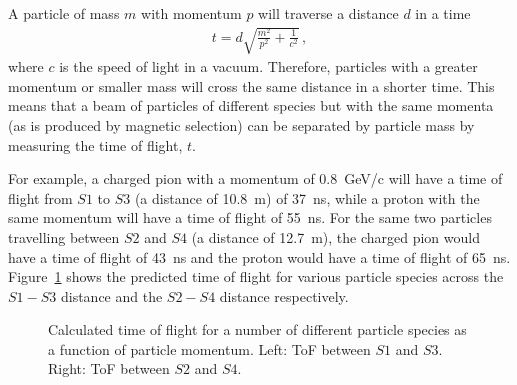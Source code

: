 A particle of mass $m$ with momentum $p$ will traverse a distance $d$ in a time
\begin{align}
  t = d \sqrt{\frac{m^2}{p^2} + \frac{1}{c^2}} \,, 
\end{align}
where $c$ is the speed of light in a vacuum.
Therefore, particles with a greater momentum or smaller mass will cross the same distance in a shorter time.
This means that a beam of particles of different species but with the same momenta (as is produced by magnetic selection) can be separated by particle mass by measuring the time of flight, $t$.

For example, a charged pion with a momentum of 0.8~GeV/c will have a time of flight from $\mathit{S1}$ to $\mathit{S3}$ (a distance of 10.8~m) of 37~ns, while a proton with the same momentum will have a time of flight of 55~ns.
For the same two particles travelling between $\mathit{S2}$ and $\mathit{S4}$ (a distance of 12.7~m), the charged pion would have a time of flight of 43~ns and the proton would have a time of flight of 65~ns.
Figure~\ref{fig:s1s3PredTimes} shows the predicted time of flight for various particle species across the $\mathit{S1}-\mathit{S3}$ distance and the $\mathit{S2}-\mathit{S4}$ distance respectively.

\begin{figure}[ht]
  
  \begin{minipage}[t]{0.49\textwidth}
    \begin{adjustbox}{max totalsize={\textwidth}{.5\textheight},center}
      
    \end{adjustbox}
  \end{minipage}
  \hfill
  \begin{minipage}[t]{0.49\textwidth}
    \begin{adjustbox}{max totalsize={\textwidth}{.5\textheight},center}
      
    \end{adjustbox}
  \end{minipage}
   \caption{\label{fig:s1s3PredTimes}Calculated time of flight for a number of different particle species as a function of particle momentum. Left: ToF between $\mathit{S1}$ and $\mathit{S3}$. Right: ToF between $\mathit{S2}$ and $\mathit{S4}$.}
\end{figure}

